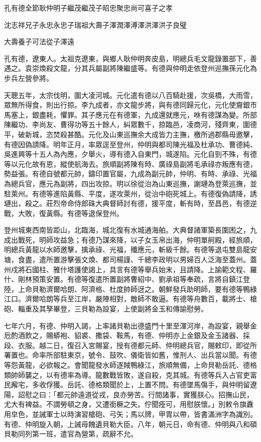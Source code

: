 
\begin{pinyinscope}
孔有德全節耿仲明子繼茂繼茂子昭忠聚忠尚可喜子之孝

沈志祥兄子永忠永忠子瑞祖大壽子澤潤澤溥澤洪澤洪子良璧

大壽養子可法從子澤遠

孔有德，遼東人。太祖克遼東，與鄉人耿仲明奔皮島，明總兵毛文龍錄置部下，善遇之。袁崇煥殺文龍，分其兵屬副將陳繼盛等。有德與仲明走依登州巡撫孫元化為步兵左營參將。

天聰五年，太宗伐明，圍大凌河城。元化遣有德以八百騎赴援，次吳橋，大雨雪，眾無所得食，則出行掠。李九成者，亦文龍步將，與有德同歸元化，元化使齎銀市馬塞上，銀盡耗，懼罪。其子應元在有德軍，九成還就應元，咻有德謀為變。所部陳繼功、李尚友、曹得功等五十餘人，糾眾數千，掠臨邑，凌商河，殘齊東，圍德平，破新城，恣焚殺甚酷。元化及山東巡撫余大成皆力主撫，檄所過郡縣毋邀擊，有德因偽請降。明年正月，率眾逕至登州，仲明與都司陳光福及杜承功、曹德純、吳進興等十五人為內應，夕舉火，導有德入自東門，城遂陷。元化自剄不殊，有德等以元化故有恩，縱使航海去。旅順副將陳有時、廣祿島副將毛承祿亦叛應有德，勢益張。有德自號都元帥，鑄印置官屬，九成為副元帥，仲明、有時、承祿、光福為總兵官，應元為副將，四出攻掠。明以徐從治為山東巡撫，謝璉為登萊巡撫，並駐萊州。有德等進陷黃縣、平度，遂攻萊州，從治中砲死城上。有德復偽請降，誘璉出，殺之。莊烈帝命侍郎硃大典督師討有德，援平度，斬有時，至昌邑，有德逆戰，大敗，復黃縣。有德等退保登州。

登州城東西南皆距山，北臨海，城北復有水城通海舶。大典督諸軍築長圍困之，九成出戰死，明師攻益急；有德乃謀來降，以子女玉帛出海，仲明單舸殿，經旅順，明總兵黃龍以水師邀擊，擒承祿、光福，殲應元，斬級千餘。有德等退屯雙島龍安塘，食盡，遣所置游擊張文煥、都司楊謹、千總李政明以男婦百人泛海至蓋州。蓋州戍將石國柱、雅什塔護使謁上，具言有德等舉兵始末，且請降。上諭範文程、羅什、剛林預策安置。有德等復遣所置副將曹紹中、劉承祖等奉疏，言將自鎮江登陸，上命貝勒濟爾哈朗、阿濟格、杜度帥師迓之。朝鮮發兵助明師，要有德等鴨綠江口。濟爾哈朗等兵至江岸，嚴陣相對，敵師不敢逼。有德等舟數百，載將士、槍砲、輜重及其孥畢登，三貝勒為設宴，上使副將金玉和傳諭慰勞。

七年六月，有德、仲明入謁，上率諸貝勒出德盛門十里至渾河岸，為設宴，親舉金卮酌酒飲之，賜蟒袍、貂裘、撒袋、鞍馬，有德、仲明亦上金銀及金玉諸器、採段、衣服。越二日，復召入宮賜宴，授有德都元師、仲明總兵官，賜敕印，即從所署置也。命率所部駐東京，號令、鼓吹、儀衛皆如舊，惟刑人、出兵當以聞。有德等怨黃龍，必欲報之。會聞龍發水師逐賊鴨綠江，旅順無備，上命貝勒岳託、德格類帥師襲之，以有德率為導。龍數戰皆敗，遂自殺，克其城。有德等兵入占官吏富民廨宅，多收俘獲。岳託、德格類聞於上，上置不問。有德墜馬傷手，與仲明留遼陽，詔慰之曰：「都元帥遠道從戎，良亦勞苦。行間諸事，實獲朕心。招撫山民，尤大有裨益。不謂勞頓之身，又遭銜橛之失。佇聞痊可，用慰朕懷。」別敕令旗纛用皁色，並誡軍士以時演習槍砲、弓矢；馬以牌，甲胄以帶，皆書滿洲字為識別。有德、仲明旋入朝，上誡毋餽遺貝勒大臣。八年，朝元日，命有德、仲明與八和碩貝勒同列第一班，遣官為營第，疏辭不允。


\end{pinyinscope}
